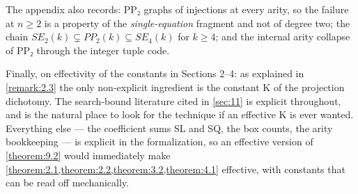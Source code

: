 The appendix also records: PP₂ graphs of injections at every arity, so the failure at $n ≥ 2$ is a property of the \emph{single-equation} fragment and not of degree two; the chain $SE_{2}(k) ⊊ PP_{2}(k) ⊆ SE_{4}(k)$ for $k ≥ 4$; and the internal arity collapse of PP₂ through the integer tuple code.

Finally, on effectivity of the constants in Sections 2–4: as explained in \cref{remark:2.3} the only non-explicit ingredient is the constant K of the projection dichotomy. The search-bound literature cited in \cref{sec:11} is explicit throughout, and is the natural place to look for the technique if an effective K is ever wanted. Everything else — the coefficient sums SL and SQ, the box counts, the arity bookkeeping — is explicit in the formalization, so an effective version of \cref{theorem:9.2} would immediately make \cref{theorem:2.1,theorem:2.2,theorem:3.2,theorem:4.1} effective, with constants that can be read off mechanically.

